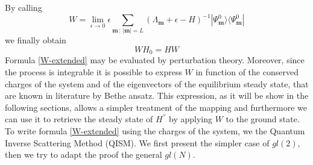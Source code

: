 \documentclass[10pt]{article}
\numberwithin{equation}{section}
\numberwithin{equation}{subsection}
\begin{document}
By calling 
\begin{equation}\label{W-extended}
	W= \lim_{\epsilon\to 0}\epsilon\sum_{\bm{m}\,:\,|\bm{m}|=L}  \left(\Lambda_{\bm{m}}+\epsilon-H\right)^{-1}|\Psi_{\bm{m}}^{0}\rangle \langle \Psi_{\bm{m}}^{0}|
\end{equation}
we finally obtain 
\begin{equation}
	WH_{0}=HW
\end{equation}
Formula \eqref{W-extended} may be evaluated by perturbation theory. Moreover, since the process is integrable it is possible to express $W$ in function of the conserved charges of the system and of the eigenvectors of the equilibrium steady state, that are known in literature by Bethe ansatz. This expression, as it will be show in the following sections, allows a simpler treatment of the mapping and furthermore we can use it to retrieve the steady state of $H^{''}$ by applying $W$ to the ground state. To write formula \eqref{W-extended} using the charges of the system, we the Quantum Inverse Scattering Method (QISM). We first present the simpler case of $gl(2)$, then we try to adapt the proof the general $gl(N)$. 
\end{document}
